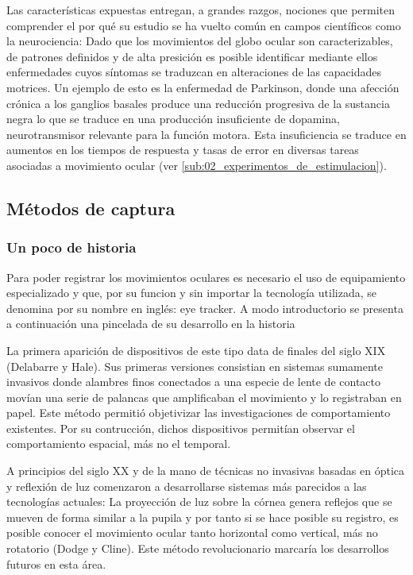 \documentclass[../main.tex]{subfiles}
\begin{document}
		Las características expuestas entregan, a grandes razgos, nociones que permiten comprender el por qué su estudio se ha vuelto común en campos científicos como la neurociencia: Dado que los movimientos del globo ocular son caracterizables, de patrones definidos y de alta presición es posible identificar mediante ellos enfermedades cuyos síntomas se traduzcan en alteraciones de las capacidades motrices. Un ejemplo de esto es la enfermedad de Parkinson, donde una afección crónica a los ganglios basales produce una reducción progresiva de la sustancia negra lo que se traduce en una producción insuficiente de dopamina, neurotransmisor relevante para la función motora. Esta insuficiencia se traduce en aumentos en los tiempos de respuesta y tasas de error en diversas tareas asociadas a movimiento ocular (ver \ref{sub:02_experimentos_de_estimulacion}).    

		\subsection{Métodos de captura}
		\label{sub:02_metodos_de_captura}
			\subsubsection{Un poco de historia} 
			\label{ssub:02_un_poco_de_historia_monitores}
			
			Para poder registrar los movimientos oculares es necesario el uso de equipamiento especializado y que, por su funcion y sin importar la tecnología utilizada, se denomina por su nombre en inglés: eye tracker. A modo introductorio se presenta a continuación una pincelada de su desarrollo en la historia \cite{article:eyetracker_eggert, article:eyetracker_richardson}

			La primera aparición de dispositivos de este tipo data de finales del siglo XIX (Delabarre y Hale). Sus primeras versiones consistian en sistemas sumamente invasivos donde alambres finos conectados a una especie de lente de contacto movían una serie de palancas que amplificaban el movimiento y lo registraban en papel. Este método permitió objetivizar las investigaciones de comportamiento existentes. Por su contrucción, dichos dispositivos permitían observar el comportamiento espacial, más no el temporal. 

			A principios del siglo XX y de la mano de técnicas no invasivas basadas en óptica y reflexión de luz comenzaron a desarrollarse sistemas más parecidos a las tecnologías actuales: La proyección de luz sobre la córnea genera reflejos que se mueven de forma similar a la pupila y por tanto si se hace posible su registro, es posible conocer el movimiento ocular tanto horizontal como vertical, más no rotatorio (Dodge y Cline). Este método revolucionario marcaría los desarrollos futuros en esta área.
\end{document}

